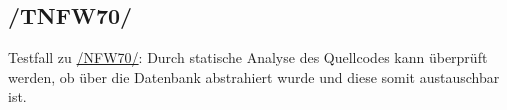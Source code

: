 \subsection*{/TNFW70/}

\label{/TNFW70/} Testfall zu \hyperref[/NFW70/]{/NFW70/}: Durch \gls{statische Analyse} des \Gls{Quellcode}s kann überprüft werden, ob über die \Gls{Datenbank} abstrahiert wurde und diese somit austauschbar ist.